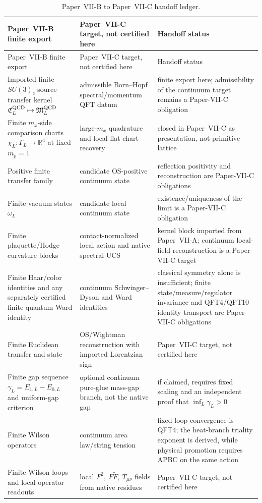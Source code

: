 \documentclass[12pt,a4paper]{article}
\begin{document}
\begin{longtable}{>{\raggedright\arraybackslash}p{} >{\raggedright\arraybackslash}p{} >{\raggedright\arraybackslash}p{}}
\caption[Paper-VII-B to Paper-VII-C handoff ledger]{Paper~VII-B to Paper~VII-C handoff ledger.}\label{p11:tab:paper12-handoff-ledger}\\
\toprule
Paper~VII-B finite export & Paper~VII-C target, not certified here & Handoff status \\
\midrule
\endfirsthead
\toprule
Paper~VII-B finite export & Paper~VII-C target, not certified here & Handoff status \\
\midrule
\endhead
Imported finite \(SU(3)_c\) source-transfer kernel \(\mathfrak C_L^{\rm QCD}\mapsto\mathfrak M_L^{\rm QCD}\) & admissible Born--Hopf spectral/momentum QFT datum & finite export here; admissibility of the continuum target remains a Paper-VII-C obligation \\
Finite \(m_x\)-side comparison charts \(\chi_L:\Gamma_L\to\mathbb R^4\) at fixed \(m_p=1\) & large-\(m_x\) quadrature and local flat chart recovery & closed in Paper~VII-C as presentation, not primitive lattice \\
Positive finite transfer family & candidate OS-positive continuum state & reflection positivity and reconstruction are Paper-VII-C obligations \\
Finite vacuum states \(\omega_L\) & candidate local continuum state & existence/uniqueness of the limit is a Paper-VII-C obligation \\
Finite plaquette/Hodge curvature blocks & contact-normalized local action and native spectral UCS & kernel block imported from Paper~VII-A; continuum local-field reconstruction is a Paper-VII-C target \\
Finite Haar/color identities and any separately certified finite quantum Ward identity & continuum Schwinger--Dyson and Ward identities & classical symmetry alone is insufficient; finite state/measure/regulator invariance and QFT4/QFT10 identity transport are Paper-VII-C obligations \\
Finite Euclidean transfer and state & OS/Wightman reconstruction with imported Lorentzian sign & Paper~VII-C target, not certified here \\
Finite gap sequence \(\gamma_L=E_{1,L}-E_{0,L}\) and uniform-gap criterion & optional continuum pure-glue mass-gap branch, not the native gap & if claimed, requires fixed scaling and an independent proof that \(\inf_L\gamma_L>0\) \\
Finite Wilson operators & continuum area law/string tension & fixed-loop convergence is QFT4; the heat-branch triality exponent is derived, while physical promotion requires APBC on the same action \\
Finite Wilson loops and local operator readouts & local \(F^2,\ F\widetilde F,\ T_{\mu\nu}\) fields from native residues & Paper~VII-C target, not certified here \\
\bottomrule
\end{longtable}
\end{document}
